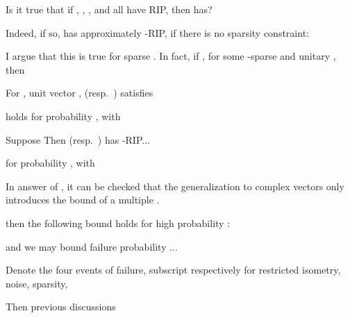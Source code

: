 {
\I Is it true that if , , , and  all have RIP, then  has?

\I Indeed, if so,  has approximately -RIP, if there is no sparsity constraint:

\I I argue that this is true for sparse .
In fact, if , for some -sparse  and unitary , then

}
{
\I For , unit vector ,  (resp.\ ) satisfies
%

\I holds for probability , with
}
{
\I Suppose
%
%
\I Then  (resp.\ ) has -RIP...

\I for probability , with
}
{
\I In answer of , it can be checked that the generalization to complex vectors only introduces the bound of a multiple .

\I then the following bound holds for high probability :

\I and we may bound failure probability ...
}
{
\I Denote the four events of failure, subscript respectively for restricted isometry, noise, sparsity,

\I Then previous discussions
}
